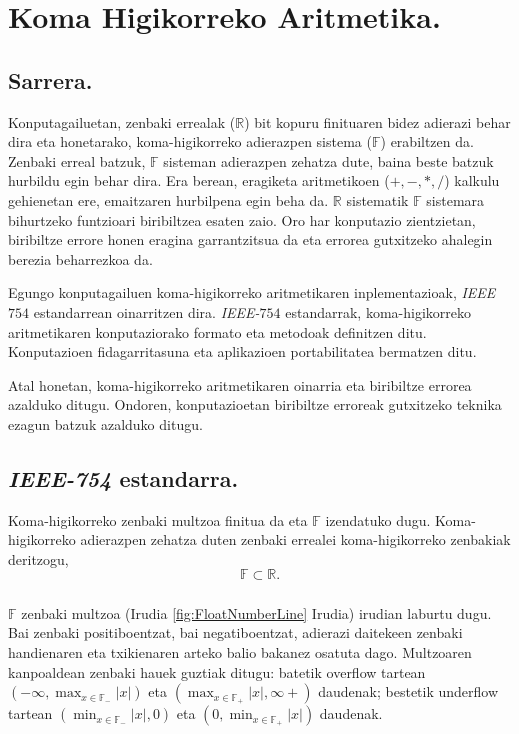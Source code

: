 \chapter{Koma Higikorreko Aritmetika.}
\label{sec:4}

\section{Sarrera.}

Konputagailuetan, zenbaki errealak ($\mathbb{R}$) bit kopuru finituaren bidez adierazi behar dira eta honetarako, koma-higikorreko adierazpen sistema ($\mathbb{F}$) erabiltzen da. Zenbaki erreal batzuk, $\mathbb{F}$ sisteman adierazpen zehatza dute, baina beste batzuk hurbildu egin behar dira.  Era berean, eragiketa aritmetikoen ($+,-,*,/$) kalkulu gehienetan ere, emaitzaren hurbilpena egin beha da. $\mathbb{R}$ sistematik $\mathbb{F}$ sistemara bihurtzeko funtzioari biribiltzea esaten zaio. Oro har konputazio zientzietan, biribiltze errore honen eragina garrantzitsua da eta errorea gutxitzeko ahalegin berezia beharrezkoa da.

Egungo konputagailuen koma-higikorreko aritmetikaren inplementazioak, \emph{IEEE $754$} estandarrean oinarritzen dira. 
\emph{IEEE-$754$} estandarrak, koma-higikorreko aritmetikaren konputaziorako formato eta metodoak definitzen ditu. Konputazioen fidagarritasuna eta aplikazioen portabilitatea bermatzen ditu.    
 
Atal honetan, koma-higikorreko aritmetikaren oinarria eta biribiltze errorea azalduko ditugu. Ondoren, konputazioetan biribiltze erroreak gutxitzeko teknika ezagun batzuk azalduko ditugu. 

\section{\emph{IEEE-754} estandarra.}

Koma-higikorreko zenbaki multzoa finitua da eta ${\mathbb{F}}$ izendatuko dugu. Koma-higikorreko adierazpen zehatza duten zenbaki errealei koma-higikorreko zenbakiak deritzogu, 
\begin{equation*}
\mathbb{F}\subset \mathbb{R}.
\end{equation*}

\paragraph*{}$\mathbb{F}$ zenbaki multzoa (Irudia \ref{fig:FloatNumberLine} Irudia) irudian laburtu dugu. Bai zenbaki positiboentzat, bai negatiboentzat, adierazi daitekeen zenbaki handienaren eta txikienaren arteko balio bakanez osatuta dago. Multzoaren kanpoaldean zenbaki hauek guztiak ditugu: batetik overflow tartean $(-\infty,\max_{x \in \mathbb{F_{-}}}|x|)$  eta $(\max_{x \in \mathbb{F_{+}}}|x|,\infty+)$ daudenak; bestetik underflow tartean  $(\min_{x \in \mathbb{F_{-}}}|x|,0)$ eta $(0,\min_{x \in \mathbb{F_{+}}}|x|)$ daudenak. 

